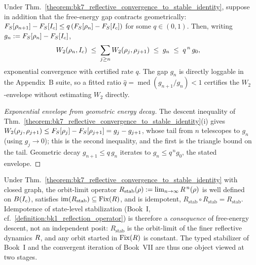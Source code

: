 \begin{corollary}
\label{corollary:bk7_geometric_convergence_rate}
Under Thm.~\ref{theorem:bk7_reflective_convergence_to_stable_identity}, suppose in addition that the free-energy gap contracts geometrically: $F_S[\rho_{n+1}] - F_S[I_c] \le q\,(F_S[\rho_n] - F_S[I_c])$ for some $q \in (0,1)$. Then, writing $g_n := F_S[\rho_n] - F_S[I_c]$,
\[
W_2(\rho_n, I_c) \;\le\; \sum_{j \ge n}W_2(\rho_j,\rho_{j+1}) \;\le\; g_n \;\le\; q^{\,n}\,g_0,
\]
exponential convergence with certified rate $q$. The gap $g_n$ is directly loggable in the Appendix~B suite, so a fitted ratio $\widehat{q} = \operatorname{med}(g_{n+1}/g_n) < 1$ certifies the $W_2$-envelope without estimating $W_2$ directly.
\end{corollary}

\begin{proof}[Exponential envelope from geometric energy decay]
\label{proof:bk7_geometric_convergence_rate}
\leavevmode
The descent inequality of Thm.~\ref{theorem:bk7_reflective_convergence_to_stable_identity}(i) gives $W_2(\rho_j,\rho_{j+1}) \le F_S[\rho_j] - F_S[\rho_{j+1}] = g_j - g_{j+1}$, whose tail from $n$ telescopes to $g_n$ (using $g_j \to 0$); this is the second inequality, and the first is the triangle bound on the tail. Geometric decay $g_{n+1} \le q\,g_n$ iterates to $g_n \le q^{\,n} g_0$, the stated envelope.
\end{proof}

\begin{proposition}
\label{proposition:bk7_stabilization_as_orbit_limit}
Under Thm.~\ref{theorem:bk7_reflective_convergence_to_stable_identity} with closed graph, the orbit-limit operator $R_{\mathrm{stab}}(\rho) := \lim_{n\to\infty}R^{\,n}(\rho)$ is well defined on $B(I_c)$, satisfies $\operatorname{im}(R_{\mathrm{stab}}) \subseteq \operatorname{Fix}(R)$, and is idempotent, $R_{\mathrm{stab}} \circ R_{\mathrm{stab}} = R_{\mathrm{stab}}$. Idempotence of state-level stabilization (Book~I, cf.~\ref{definition:bk1_reflection_operator}) is therefore a \emph{consequence} of free-energy descent, not an independent posit: $R_{\mathrm{stab}}$ is the orbit-limit of the finer reflective dynamics $R$, and any orbit started in $\operatorname{Fix}(R)$ is constant. The typed stabilizer of Book~I and the convergent iteration of Book~VII are thus one object viewed at two stages.
\end{proposition}

